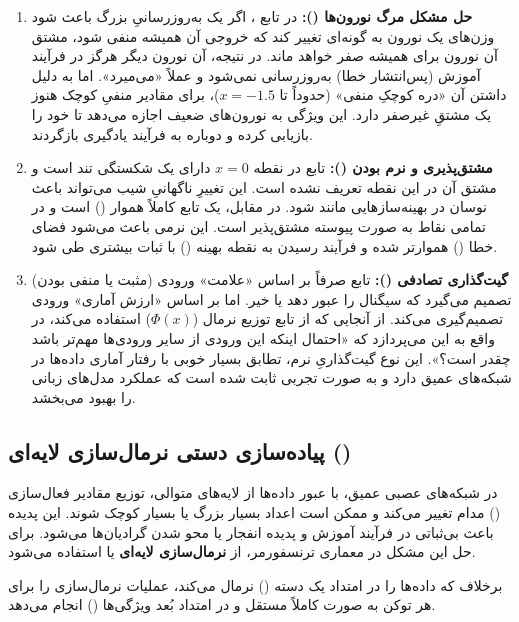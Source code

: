 \documentclass{article}
\begin{document}
\begin{enumerate}
	\item \textbf{حل مشکل مرگ نورون‌ها ():}
	در تابع ، اگر یک به‌روزرسانیِ بزرگ باعث شود وزن‌های یک نورون به گونه‌ای تغییر کند که خروجی آن همیشه منفی شود، مشتق آن نورون برای همیشه صفر خواهد ماند. در نتیجه، آن نورون دیگر هرگز در فرآیند آموزش (پس‌انتشار خطا) به‌روزرسانی نمی‌شود و عملاً «می‌میرد». اما  به دلیل داشتن آن «دره کوچکِ منفی» (حدوداً تا $x = -1.5$)، برای مقادیر منفیِ کوچک هنوز یک مشتقِ غیرصفر دارد. این ویژگی به نورون‌های ضعیف اجازه می‌دهد تا خود را بازیابی کرده و دوباره به فرآیند یادگیری بازگردند.
	
	\item \textbf{مشتق‌پذیری و نرم بودن ():}
	تابع  در نقطه $x=0$ دارای یک شکستگی تند است و مشتق آن در این نقطه تعریف ‌نشده است. این تغییرِ ناگهانیِ شیب می‌تواند باعث نوسان در بهینه‌سازهایی مانند  شود. در مقابل،  یک تابع کاملاً هموار () است و در تمامی نقاط به صورت پیوسته مشتق‌پذیر است. این نرمی باعث می‌شود فضای خطا () هموارتر شده و فرآیند رسیدن به نقطه بهینه () با ثبات بیشتری طی شود.
	
	\item \textbf{گیت‌گذاری تصادفی ():}
	تابع  صرفاً بر اساس «علامت» ورودی (مثبت یا منفی بودن) تصمیم می‌گیرد که سیگنال را عبور دهد یا خیر. اما  بر اساس «ارزش آماری» ورودی تصمیم‌گیری می‌کند. از آنجایی که  از تابع توزیع نرمال ($\Phi(x)$) استفاده می‌کند، در واقع به این می‌پردازد که «احتمال اینکه این ورودی از سایر ورودی‌ها مهم‌تر باشد چقدر است؟». این نوع گیت‌گذاریِ نرم، تطابق بسیار خوبی با رفتار آماری داده‌ها در شبکه‌های عمیق دارد و به صورت تجربی ثابت شده است که عملکرد مدل‌های زبانی را بهبود می‌بخشد.
\end{enumerate}
\subsection{پیاده‌سازی دستی نرمال‌سازی لایه‌ای ()}

در شبکه‌های عصبی عمیق، با عبور داده‌ها از لایه‌های متوالی، توزیع مقادیر فعال‌سازی () مدام تغییر می‌کند و ممکن است اعداد بسیار بزرگ یا بسیار کوچک شوند. این پدیده باعث بی‌ثباتی در فرآیند آموزش و پدیده انفجار یا محو شدن گرادیان‌ها می‌شود. برای حل این مشکل در معماری ترنسفورمر، از \textbf{نرمال‌سازی لایه‌ای} یا  استفاده می‌شود.

برخلاف  که داده‌ها را در امتداد یک دسته () نرمال می‌کند،  عملیات نرمال‌سازی را برای هر توکن به صورت کاملاً مستقل و در امتداد بُعد ویژگی‌ها () انجام می‌دهد.
\end{document}

